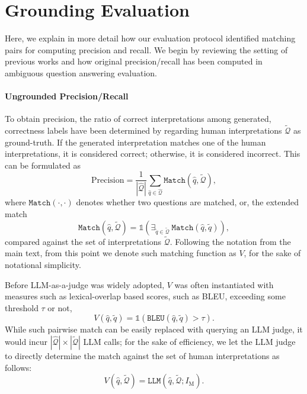 



\section{Grounding Evaluation}
\label{app:precision_recall}

Here, we explain in more detail how our evaluation protocol identified matching pairs for computing precision and recall.
We begin by reviewing the setting of previous works and how original precision/recall has been computed in ambiguous question answering evaluation.

\paragraph{Ungrounded Precision/Recall} To obtain precision, the ratio of correct interpretations among generated, correctness labels have been determined by regarding human interpretations $\tilde{\mathcal{Q}}$ as ground-truth.
If the generated interpretation matches one of the human interpretations, it is considered correct; otherwise, it is considered incorrect.
This can be formulated as
\begin{equation}
\mathrm{Precision} = \frac{1}{|\hat{\mathcal{Q}}|} \sum_{\hat{q}\in \hat{\mathcal{Q}}} \texttt{Match} \left(\hat{q},\tilde{\mathcal{Q}}\right), 
\label{eq:def_precision_old}
\end{equation}
where $\texttt{Match}(\cdot, \cdot)$ denotes whether two questions are matched, or, the extended match
\begin{equation}
\texttt{Match}(\hat{q}, \tilde{\mathcal{Q}}) = \mathds{1} \left( \exists_{\tilde{q}\in\tilde{\mathcal{Q}}} \ \texttt{Match}\left(\hat{q},\tilde{q}\right) \right),
\end{equation}
compared against the set of interpretations $\tilde{\mathcal{Q}}$. %
Following the notation from the main text, from this point we denote such matching function as $V$, for the sake of notational simplicity.

Before LLM-as-a-judge was widely adopted, 
$V$ was often instantiated with measures such as lexical-overlap based scores, such as BLEU, exceeding some threshold $\tau$ or not,
\begin{equation}
V \left(\hat{q},\tilde{q}\right) = \mathds{1} \left( \texttt{BLEU}\left(\hat{q},\tilde{q}\right) > \tau \right).
\end{equation}
While such pairwise match can be easily replaced with querying an LLM judge, it would incur $|\hat{\mathcal{Q}}|\times|\tilde{\mathcal{Q}}|$ LLM calls;
for the sake of efficiency, we let the LLM judge to directly determine the match against the set of human interpretations as follows:
\begin{equation}
V\left(\hat{q},\tilde{\mathcal{Q}}\right) = \texttt{LLM}\left(\hat{q},\tilde{\mathcal{Q}}; I_{\textrm{M}}\right).
\label{eq:list_match_llm}
\end{equation}

